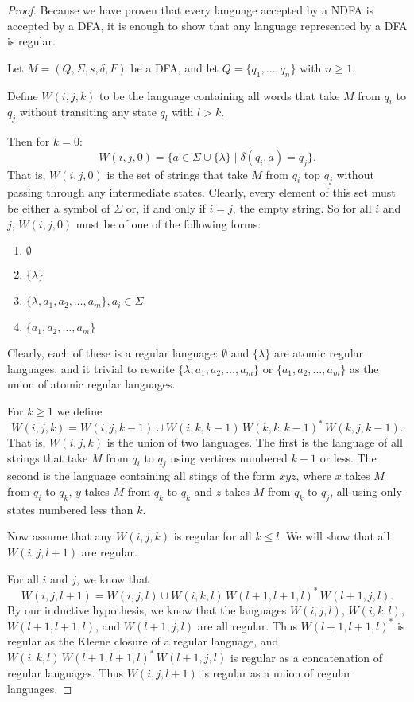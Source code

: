 \documentclass{bcthesis}
\begin{document}
	\begin{proof}
		Because we have proven that every language accepted by a NDFA is accepted by a DFA, it is enough to show that any language represented by a DFA is regular.

		Let $M = (Q, \Sigma, s, \delta, F)$ be a DFA, and let $Q = \{ q_1, \dots, q_n \}$ with $n \geq 1$.

		Define $W(i, j, k)$ to be the language containing all words that take $M$ from $q_i$ to $q_j$ without transiting any state $q_l$ with $l > k$.

		Then for $k = 0$:
		\[
			W(i, j, 0) = \{ a \in \Sigma \cup \{ \lambda \} \mid \delta(q_i, a) = q_j \}.
		\]
		That is, $W(i, j, 0)$ is the set of strings that take $M$ from $q_i$ top $q_j$ without passing through any intermediate states.
		Clearly, every element of this set must be either a symbol of $\Sigma$ or, if and only if $i = j$, the empty string.
		So for all $i$ and $j$, $W(i, j, 0)$ must be of one of the following forms:
		\begin{enumerate}[label=(\roman*), itemsep = -0.3 ex, nolistsep]
			\item $\emptyset$
			\item $\{ \lambda \}$
			\item $\{ \lambda, a_1, a_2, \dots, a_m \}, a_i \in \Sigma$
			\item $\{ a_1, a_2, \dots, a_m \}$
		\end{enumerate}
		Clearly, each of these is a regular language: $\emptyset$ and $\{ \lambda \}$ are atomic regular languages, and it trivial to rewrite $\{ \lambda, a_1, a_2, \dots, a_m \}$ or $\{ a_1, a_2, \dots, a_m \}$ as the union of atomic regular languages.

		For $k \geq 1$ we define
		\[
			W(i, j, k) = W(i, j, k-1) \cup W(i, k, k-1)\, W(k, k, k-1)^*\, W(k, j, k-1).
		\]
		That is, $W(i, j, k)$ is the union of two languages.
		The first is the language of all strings that take $M$ from $q_i$ to $q_j$ using vertices numbered $k-1$ or less.
		The second is the language containing all stings of the form $xyz$, where $x$ takes $M$ from $q_i$ to $q_k$, $y$ takes $M$ from $q_k$ to $q_k$ and $z$ takes $M$ from $q_k$ to $q_j$, all using only states numbered less than $k$.

		Now assume that any $W(i, j, k)$ is regular for all $k \leq l$.
		We will show that all $W(i, j, l+1)$ are regular.

		For all $i$ and $j$, we know that 
		\[
			W(i, j, l+1) = W(i, j, l) \cup W(i, k, l)\, W(l+1, l+1, l)^*\, W(l+1, j, l).
		\]
		By our inductive hypothesis, we know that the languages $W(i, j, l)$, $W(i, k, l)$, $W(l+1, l+1, l)$, and $W(l+1, j, l)$ are all regular.
		Thus $W(l+1, l+1, l)^*$ is regular as the Kleene closure of a regular language, and $W(i, k, l)\, W(l+1, l+1, l)^*\, W(l+1, j, l)$ is regular as a concatenation of regular languages.
		Thus $W(i, j, l+1)$ is regular as a union of regular languages.



	\end{proof}
	
\end{document}

